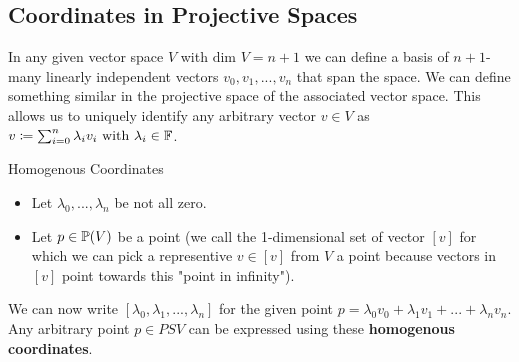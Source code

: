 \subsection{Coordinates in Projective Spaces}
In any given vector space $V$ with $\text{dim $V$}=n+1$ we can define a basis of $n+1$-many linearly independent vectors $v_0,v_1,...,v_n$ that span the space. We can define something similar in the projective space of the associated vector space. This allows us to uniquely identify any arbitrary vector $v\in V$ as $v \coloneq \sum_{i=0}^n {\lambda_iv_i} \text{ with } \lambda_i \in \mathbb{F}$.

\begin{definitionBox}{Homogenous Coordinates}
    \begin{itemize}
        \item Let $\lambda_0, ..., \lambda_n$ be not all zero.
        \item Let $p \in \mathbb{P}(V)$ be a point (we call the 1-dimensional set of vector $[v]$ for which we can pick a representive $v \in [v]$ from $V$ a point because vectors in $[v]$ point towards this "point in infinity").
    \end{itemize}
    We can now write $[\lambda_0,\lambda_1,...,\lambda_n]$ for the given point $p = \lambda_0v_0+\lambda_1v_1+...+\lambda_nv_n$. \\
    Any arbitrary point $p\in PSV$ can be expressed using these \textbf{homogenous coordinates}.
\end{definitionBox}